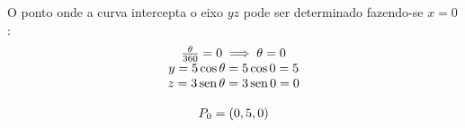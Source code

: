 \documentclass[a4paper,11pt,pagenumber=true]{article}
\newcommand{\sen}{\text{\,sen\,}}
\theoremstyle{mytheor}
\begin{document}
            O ponto onde a curva intercepta o eixo $yz$ pode ser determinado fazendo-se $x = 0$:
            \[
                \begin{matrix}
                    \frac{\theta}{360} = 0 \implies \theta = 0  \\
                    y = 5 \cos \theta = 5 \cos 0 = 5            \\
                    z = 3 \sen \theta = 3 \sen 0 = 0            \\
                    \\
                    P_0 = (0, 5, 0)
                \end{matrix}
            \]

            
\end{document}
